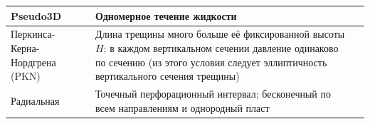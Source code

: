 \begin{longtable}[l]{|L{2.8cm}|L{6.7cm}|L{6.2cm}|}
	Pseudo3D&Одномерное течение жидкости&\hfill\break{}\\ \hline
	Перкинса- Керна- Нордгрена (PKN)&Длина трещины много больше её фиксированной высоты $H$; в каждом вертикальном сечении давление одинаково по сечению (из этого условия следует эллиптичность вертикального сечения трещины)&\hfill\break{}\\ \hline
	Радиальная&Точечный перфорационный интервал; бесконечный по всем направлениям и однородный пласт&\hfill\break{}\\ \hline

\end{longtable}
